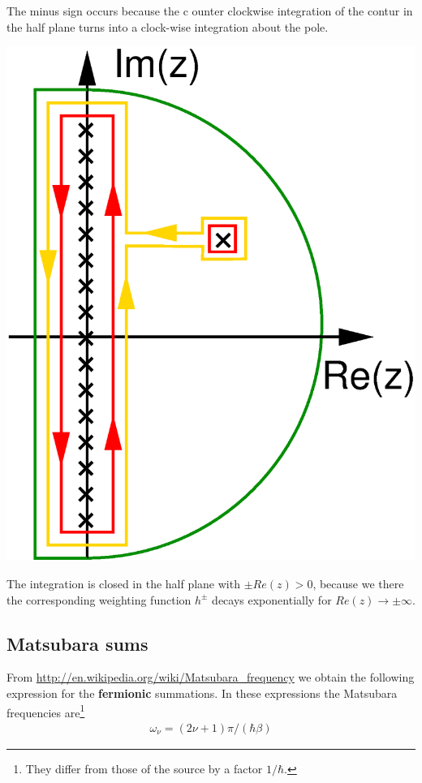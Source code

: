 \documentclass[11pt,a4paper]{report}
\begin{document}
The minus sign occurs because the c ounter clockwise integration of
the contur in the half plane turns into a clock-wise integration about
the pole.

\begin{center}
\includegraphics[width=0.25\linewidth]{Figs/Xfig/Matsubaracontour/contour.eps}
\end{center}

The integration is closed in the half plane with $\pm Re(z)>0$, because
we there the corresponding weighting function $h^{\pm}$ decays
exponentially for $Re(z)\rightarrow\pm\infty$.


\subsection{Matsubara sums}
From \url{http://en.wikipedia.org/wiki/Matsubara_frequency} we obtain
the following expression for the \textbf{fermionic} summations.  In
these expressions the Matsubara frequencies are\footnote{They differ
  from those of the source by a factor $1/\hbar$.}
\begin{eqnarray}
\omega_\nu=(2\nu+1)\pi/(\hbar\beta)
\end{eqnarray}
\end{document}
